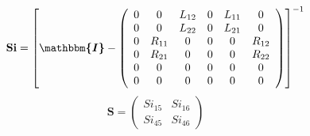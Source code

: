 \[ \mathbf{Si} = \left[ \boldsymbol{\mathbbm{I}}  -
\left(\begin{array}{cccccc} 0 & 0 & L_{12} & 0 & L_{11} & 0 \\ 0 & 0 &
L_{22} & 0 & L_{21} & 0 \\ 0 & R_{11} & 0 & 0 & 0 & R_{12} \\ 0 &
R_{21} & 0 & 0 & 0 & R_{22} \\ 0 & 0 & 0 & 0 & 0 & 0 \\ 0 & 0 & 0 & 0
& 0 & 0 \end{array}\right) \right]^{-1} \]
\[ \mathbf{S} = \left(\begin{array}{cc} Si_{15} & Si_{16} \\ Si_{45} &
Si_{46} \end{array}\right) \]
